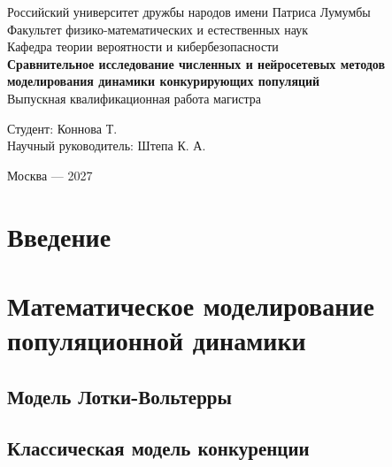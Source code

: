 



\begin{titlepage}
  \centering
  \vspace*{1cm}
  {\large Российский университет дружбы народов имени Патриса Лумумбы}\\[0.5cm]
  {\large Факультет физико-математических и естественных наук}\\[0.5cm]
  {\large Кафедра теории вероятности и кибербезопасности}\\[2cm]

  {\LARGE\bfseries Сравнительное исследование численных и нейросетевых методов моделирования динамики конкурирующих популяций}\\[1.5cm]

  {\large Выпускная квалификационная работа магистра}\\[2cm]

  \begin{flushright}
    {\large Студент: Коннова Т.}\\[0.3cm]
    {\large Научный руководитель: Штепа К. А.}\\
  \end{flushright}

  \vfill
  {\large Москва --- 2027}
\end{titlepage}

\tableofcontents
\newpage

\chapter*{Введение}


\chapter{Математическое моделирование популяционной динамики}
\label{ch:models}

\section{Модель Лотки-Вольтерры}
\label{sec:lv-model}


\section{Классическая модель конкуренции}
\label{sec:competition-ode}


